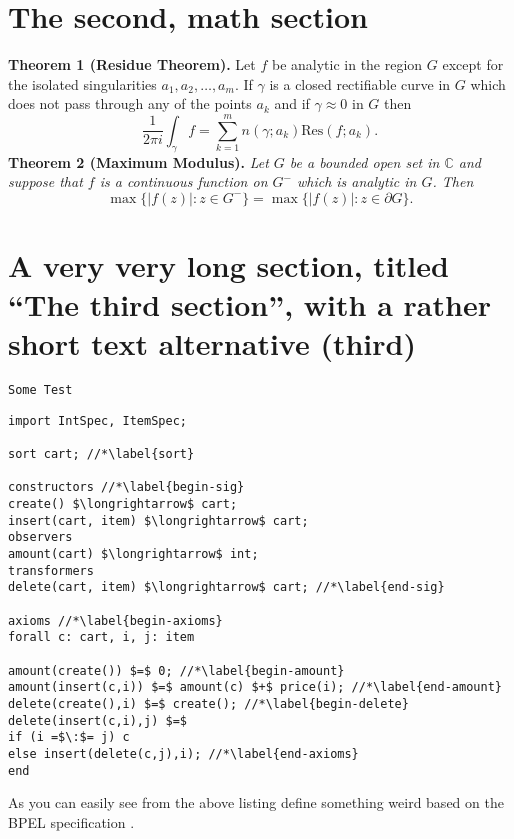 \documentclass[mscthesis]{usiinfthesis}
\begin{document}
 \section{The second, math section}

\textbf{Theorem 1 (Residue Theorem).}
Let $f$ be analytic in the region $G$ except for the isolated singularities $a_1,a_2,\ldots,a_m$. If $\gamma$ is a closed rectifiable curve in $G$ which does not pass through any of the points $a_k$ and if $\gamma\approx 0$ in $G$ then
\[
\frac{1}{2\pi i}\int_\gamma f = \sum_{k=1}^m n(\gamma;a_k) \text{Res}(f;a_k).
\]
\textbf{Theorem 2 (Maximum Modulus).}
\emph{Let $G$ be a bounded open set in $\mathbb{C}$ and suppose that $f$ is a continuous function on $G^-$ which is analytic in $G$. Then}
\[
\max\{|f(z)|:z\in G^-\}=\max \{|f(z)|:z\in \partial G \}.
\]

\section[third]{A very very long section, titled ``The third section'', with
  a rather  short text alternative (third)}

  \texttt{Some Test}
\begin{lstlisting}
import IntSpec, ItemSpec;

sort cart; //*\label{sort}

constructors //*\label{begin-sig}
create() $\longrightarrow$ cart;
insert(cart, item) $\longrightarrow$ cart;
observers
amount(cart) $\longrightarrow$ int;
transformers
delete(cart, item) $\longrightarrow$ cart; //*\label{end-sig}

axioms //*\label{begin-axioms}
forall c: cart, i, j: item 

amount(create()) $=$ 0; //*\label{begin-amount}
amount(insert(c,i)) $=$ amount(c) $+$ price(i); //*\label{end-amount}
delete(create(),i) $=$ create(); //*\label{begin-delete}
delete(insert(c,i),j) $=$
if (i =$\:$= j) c
else insert(delete(c,j),i); //*\label{end-axioms}
end
\end{lstlisting}

As you can easily see from the above listing \citet{bbggs:iet07}
define something weird based on the BPEL specification
\citep{bpelspec}.
\nocite{*}

\appendix %
\end{document}
